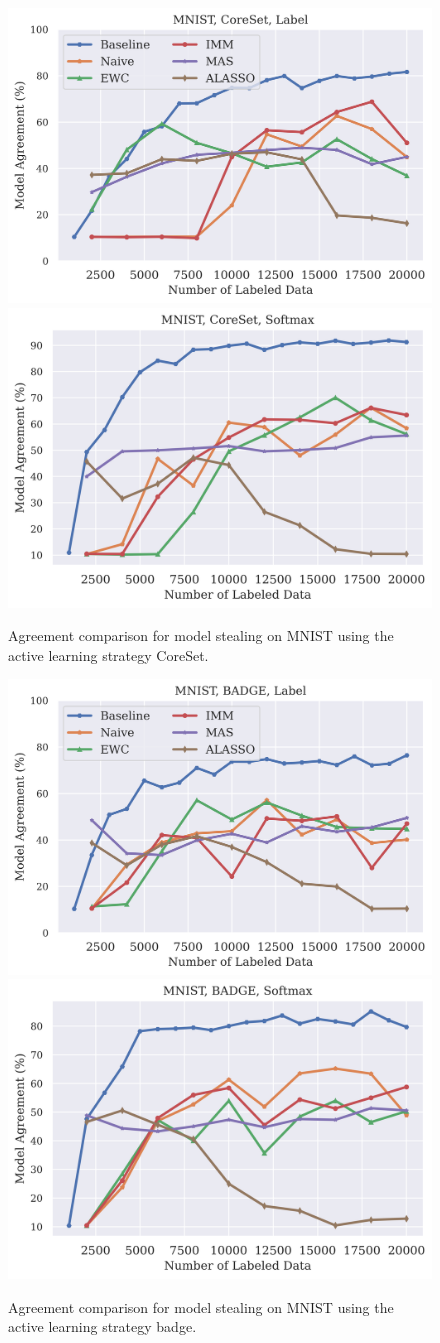 \begin{figure}[!htb]
    \centering
    \includegraphics[width=0.48\linewidth]{images/results_CALMS/mnist_label_coreset.png} \hfill
    \includegraphics[width=0.48\linewidth]{images/results_CALMS/mnist_softmax_coreset.png}
    \caption{Agreement comparison for model stealing on MNIST using the active learning strategy CoreSet.}
    \label{fig:CALMSMNISTCoreSet}
\end{figure}

\begin{figure}[!htb]
    \centering
    \includegraphics[width=0.48\linewidth]{images/results_CALMS/mnist_label_badge.png} \hfill
    \includegraphics[width=0.48\linewidth]{images/results_CALMS/mnist_softmax_badge.png}
    \caption{Agreement comparison for model stealing on MNIST using the active learning strategy \gls{badge}.}
    \label{fig:CALMSMNISTBadge}
\end{figure}

